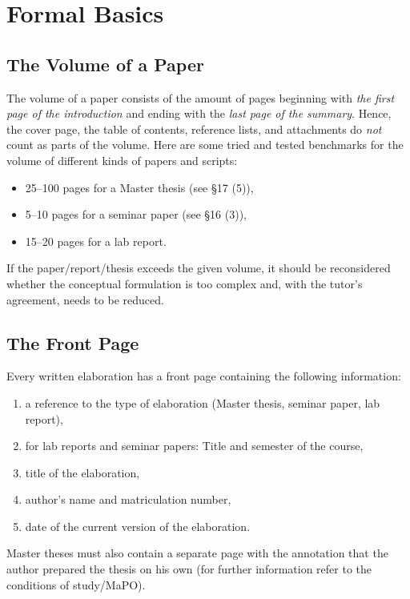 \chapter{Formal Basics}


\section{The Volume of a Paper}

The volume of a paper consists of the amount of pages beginning with \emph{the first page
of the introduction} and ending with the \emph{last page of the summary}. Hence, the
cover page, the table of contents, reference lists, and attachments do \emph{not} count
as parts of the volume. Here are some tried and tested benchmarks for the volume of
different kinds of papers and scripts:

\begin{itemize}
\item 25--100 pages for a Master thesis (see \cite{mpo08} \S 17 (5)),
\item 5--10 pages for a seminar paper (see \cite{mpo08} \S 16 (3)),
\item 15--20 pages for a lab report.
\end{itemize}

If the paper/report/thesis exceeds the given volume, it should be reconsidered whether
the conceptual formulation is too complex and, with the tutor's agreement, needs to
be reduced.


\section{The Front Page}

Every written elaboration has a front page containing the following information:

\begin{enumerate}
\item a reference to the type of elaboration (Master thesis, seminar paper, lab report),
\item for lab reports and seminar papers: Title and semester of the course,
\item title of the elaboration,
\item author's name and matriculation number,
\item date of the current version of the elaboration.
\end{enumerate}

Master theses must also contain a separate page with the annotation that the author
prepared the thesis on his own (for further information refer to the conditions of
study/MaPO).



